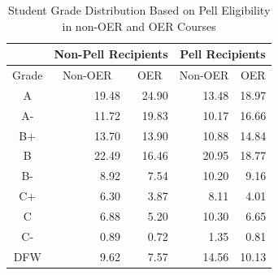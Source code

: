 \documentclass[11pt]{article}
\begin{document}
\begin{table}
\centering
\begin{tabular}{crrrr}
  & \multicolumn{2}{c}{Non-Pell Recipients} & \multicolumn{2}{c}{Pell Recipients} \\ \hline
  \multicolumn{1}{c}{Grade} & \multicolumn{1}{c}{Non-OER} & \multicolumn{1}{c}{OER} & \multicolumn{1}{c}{Non-OER} & \multicolumn{1}{c}{OER}\\ \hline
  A\hspace{1.1ex} & 19.48 & 24.90 & 13.48 & 18.97 \\
  A-\hspace{0.7ex} & 11.72 & 19.83 & 10.17 & 16.66 \\
  B+ & 13.70 & 13.90 & 10.88 & 14.84 \\
  B\hspace{1.1ex} & 22.49 & 16.46 & 20.95 & 18.77 \\
  B-\hspace{0.7ex} & 8.92 & 7.54 & 10.20 & 9.16 \\
  C+ & 6.30 & 3.87 & 8.11 & 4.01 \\
  C\hspace{1.1ex} & 6.88 & 5.20 & 10.30 & 6.65 \\
  C-\hspace{0.8ex} & 0.89 & 0.72 & 1.35 & 0.81 \\
  DFW & 9.62 & 7.57 & 14.56 & 10.13 \\ \hline
\end{tabular}
\caption{Student Grade Distribution Based on Pell Eligibility in non-OER and OER Courses \cite{CB-WC-PH:18}}
\end{table}
\end{document}

